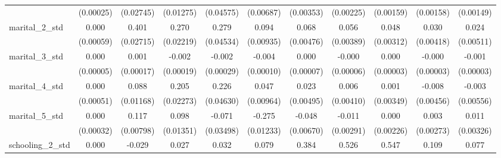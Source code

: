 {\begin{tabular}{l*{10}{c}}
                    &   (0.00025)         &   (0.02745)         &   (0.01275)         &   (0.04575)         &   (0.00687)         &   (0.00353)         &   (0.00225)         &   (0.00159)         &   (0.00158)         &   (0.00149)         \\
marital\_2\_std       &       0.000         &       0.401\sym{***}&       0.270\sym{***}&       0.279\sym{***}&       0.094\sym{***}&       0.068\sym{***}&       0.056\sym{***}&       0.048\sym{***}&       0.030\sym{***}&       0.024\sym{***}\\
                    &   (0.00059)         &   (0.02715)         &   (0.02219)         &   (0.04534)         &   (0.00935)         &   (0.00476)         &   (0.00389)         &   (0.00312)         &   (0.00418)         &   (0.00511)         \\
marital\_3\_std       &       0.000         &       0.001\sym{***}&      -0.002\sym{***}&      -0.002\sym{***}&      -0.004\sym{***}&       0.000\sym{**} &      -0.000         &       0.000\sym{*}  &      -0.000\sym{***}&      -0.001\sym{***}\\
                    &   (0.00005)         &   (0.00017)         &   (0.00019)         &   (0.00029)         &   (0.00010)         &   (0.00007)         &   (0.00006)         &   (0.00003)         &   (0.00003)         &   (0.00003)         \\
marital\_4\_std       &       0.000         &       0.088\sym{***}&       0.205\sym{***}&       0.226\sym{***}&       0.047\sym{***}&       0.023\sym{***}&       0.006         &       0.001         &      -0.008         &      -0.003         \\
                    &   (0.00051)         &   (0.01168)         &   (0.02273)         &   (0.04630)         &   (0.00964)         &   (0.00495)         &   (0.00410)         &   (0.00349)         &   (0.00456)         &   (0.00556)         \\
marital\_5\_std       &       0.000         &       0.117\sym{***}&       0.098\sym{***}&      -0.071\sym{*}  &      -0.275\sym{***}&      -0.048\sym{***}&      -0.011\sym{***}&       0.000         &       0.003         &       0.011\sym{***}\\
                    &   (0.00032)         &   (0.00798)         &   (0.01351)         &   (0.03498)         &   (0.01233)         &   (0.00670)         &   (0.00291)         &   (0.00226)         &   (0.00273)         &   (0.00326)         \\
schooling\_2\_std     &       0.000         &      -0.029         &       0.027         &       0.032\sym{***}&       0.079\sym{***}&       0.384\sym{***}&       0.526\sym{***}&       0.547\sym{***}&       0.109\sym{***}&       0.077\sym{***}\\

\end{tabular}}
